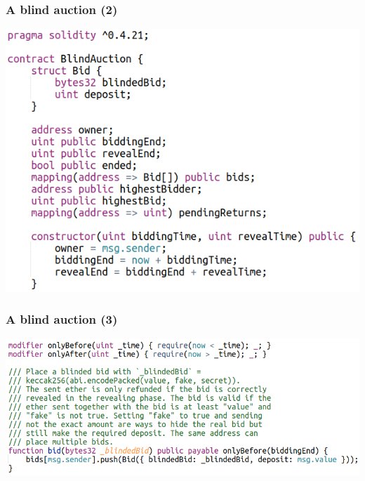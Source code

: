 \documentclass[11pt]{beamer}  %
\begin{document}
\begin{frame}\frametitle{A blind auction (2)}

  \begin{center}
    \includegraphics[scale=0.5,clip=false]{pictures/blind-auction-1.png}
  \end{center}

\end{frame}

\begin{frame}\frametitle{A blind auction (3)}

  \begin{center}
    \includegraphics[scale=0.4,clip=false]{pictures/blind-auction-2.png}
  \end{center}

\end{frame}
\end{document}
